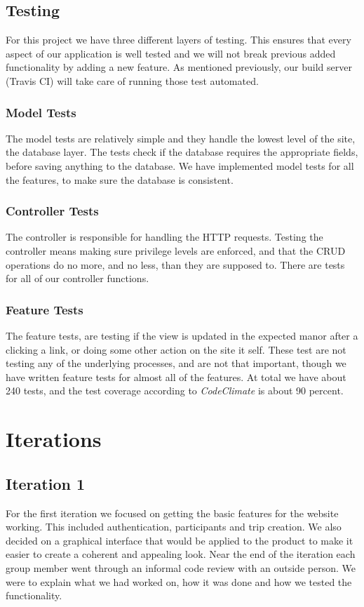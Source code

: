 \documentclass[a4paper]{article}
\begin{document}
\subsection{Testing}
For this project we have three different layers of testing. This ensures that every aspect of our application is well tested and we will not break previous added functionality by adding a new feature. As mentioned previously, our build server (Travis CI) will take care of running those test automated.

\subsubsection{Model Tests}
The model tests are relatively simple and they handle the lowest level of the site, the database layer. The tests check if the database requires the appropriate fields, before saving anything to the database. We have implemented model tests for all the features, to make sure the database is consistent.
\\

\subsubsection{Controller Tests}
The controller is responsible for handling the HTTP requests. Testing the controller means making sure privilege levels are enforced, and that the CRUD operations do no more, and no less, than they are supposed to. There are tests for all of our controller functions.
\\

\subsubsection{Feature Tests}
The feature tests, are testing if the view is updated in the expected manor after a clicking a link, or doing some other action on the site it self. These test are not testing any of the underlying processes, and are not that important, though we have written feature tests for almost all of the features. 
At total we have about 240 tests, and the test coverage according to \textit{CodeClimate} is about 90 percent. \\

\section{Iterations}
\subsection{Iteration 1}
For the first iteration we focused on getting the basic features for the website working. This included authentication, participants and trip creation. We also decided on a graphical interface that would be applied to the product to make it easier to create a coherent and appealing look. Near the end of the iteration each group member went through an informal code review with an outside person. We were to explain what we had worked on, how it was done and how we tested the functionality.\\
\end{document}
